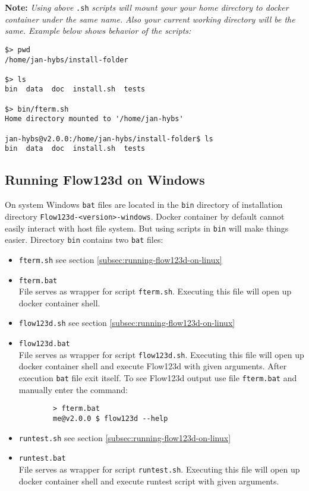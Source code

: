 \textbf{Note:}
\textit{Using above} \verb'.sh' \textit{scripts will mount your your home  directory to docker container under the same name.}
\textit{Also your current working directory will be the same. Example below shows behavior of the scripts:}
\begin{verbatim}
$> pwd
/home/jan-hybs/install-folder

$> ls
bin  data  doc	install.sh  tests

$> bin/fterm.sh
Home directory mounted to '/home/jan-hybs'

jan-hybs@v2.0.0:/home/jan-hybs/install-folder$ ls
bin  data  doc	install.sh  tests
\end{verbatim}


\subsection{Running Flow123d on Windows}
On system Windows \verb'bat' files are located in the \verb'bin' directory of installation directory \verb'Flow123d-<version>-windows'.
Docker container by default cannot easily interact with host file system. But using scripts in \verb'bin' will make things easier.
Directory \verb'bin' contains two \verb'bat' files:
\begin{itemize}
	\item \verb'fterm.sh' see section \ref{subsec:running-flow123d-on-linux}
	
	\item \verb'fterm.bat' \\
	File serves as wrapper for script \verb'fterm.sh'. Executing this file will open up docker container shell.

	\item \verb'flow123d.sh' see section \ref{subsec:running-flow123d-on-linux}	
	
	\item \verb'flow123d.bat' \\
	File serves as wrapper for script \verb'flow123d.sh'. Executing this file will open up docker container shell and execute 
	Flow123d with given arguments. After execution \verb'bat' file exit itself. To see Flow123d output use file \verb'fterm.bat'
	and manually enter the command:
	\begin{verbatim}
		> fterm.bat
		me@v2.0.0 $ flow123d --help
	\end{verbatim}

	\item \verb'runtest.sh' see section \ref{subsec:running-flow123d-on-linux}	
	
	\item \verb'runtest.bat' \\
	File serves as wrapper for script \verb'runtest.sh'. Executing this file will open up docker container shell and execute 
	runtest script with given arguments.
\end{itemize}

